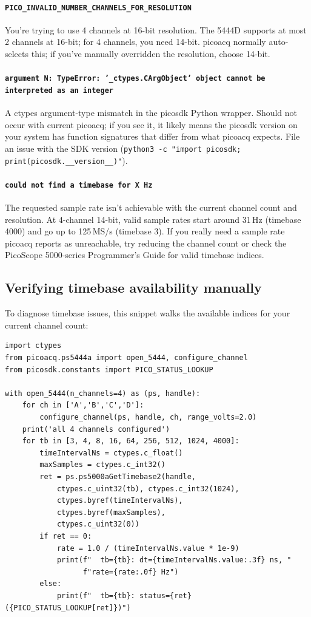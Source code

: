 \documentclass[11pt]{article}
\begin{document}
\paragraph{\texttt{PICO\_INVALID\_NUMBER\_CHANNELS\_FOR\_RESOLUTION}}
You're trying to use 4 channels at 16-bit resolution.  The 5444D
supports at most 2 channels at 16-bit; for 4 channels, you need
14-bit.  \textsf{picoacq} normally auto-selects this; if you've
manually overridden the resolution, choose 14-bit.

\paragraph{\texttt{argument N: TypeError: '\_ctypes.CArgObject' object cannot be interpreted as an integer}}
A ctypes argument-type mismatch in the picosdk Python wrapper.
Should not occur with current \textsf{picoacq}; if you see it, it
likely means the picosdk version on your system has function
signatures that differ from what \textsf{picoacq} expects.  File an
issue with the SDK version (\texttt{python3 -c "import picosdk; print(picosdk.\_\_version\_\_)"}).

\paragraph{\texttt{could not find a timebase for X Hz}}
The requested sample rate isn't achievable with the current channel
count and resolution.  At 4-channel 14-bit, valid sample rates start
around 31\,Hz (timebase 4000) and go up to 125\,MS/s (timebase 3).
If you really need a sample rate \textsf{picoacq} reports as
unreachable, try reducing the channel count or check the
PicoScope 5000-series Programmer's Guide for valid timebase indices.

\subsection{Verifying timebase availability manually}

To diagnose timebase issues, this snippet walks the available
indices for your current channel count:

\begin{lstlisting}[style=py]
import ctypes
from picoacq.ps5444a import open_5444, configure_channel
from picosdk.constants import PICO_STATUS_LOOKUP

with open_5444(n_channels=4) as (ps, handle):
    for ch in ['A','B','C','D']:
        configure_channel(ps, handle, ch, range_volts=2.0)
    print('all 4 channels configured')
    for tb in [3, 4, 8, 16, 64, 256, 512, 1024, 4000]:
        timeIntervalNs = ctypes.c_float()
        maxSamples = ctypes.c_int32()
        ret = ps.ps5000aGetTimebase2(handle,
            ctypes.c_uint32(tb), ctypes.c_int32(1024),
            ctypes.byref(timeIntervalNs),
            ctypes.byref(maxSamples),
            ctypes.c_uint32(0))
        if ret == 0:
            rate = 1.0 / (timeIntervalNs.value * 1e-9)
            print(f"  tb={tb}: dt={timeIntervalNs.value:.3f} ns, "
                  f"rate={rate:.0f} Hz")
        else:
            print(f"  tb={tb}: status={ret} ({PICO_STATUS_LOOKUP[ret]})")
\end{lstlisting}
\end{document}
